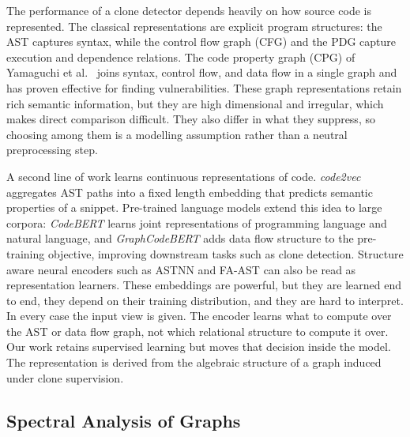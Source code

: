\documentclass[final,5p,times,twocolumn]{elsarticle}
\newcommand{\added}[1]{{\color{green!50!black}#1}}
\theoremstyle{plain}
\begin{document}
The performance of a clone detector depends heavily on how source code is
represented. The classical representations are explicit program structures:
the AST captures syntax, while the control flow graph (CFG) and the PDG
capture execution and dependence relations. The code property graph (CPG) of
Yamaguchi et al.\ \cite{yamaguchi2014cpg} joins syntax, control flow, and data
flow in a single graph and has proven effective for finding vulnerabilities.
These graph representations retain rich semantic information, but they are
high dimensional and irregular, which makes direct comparison difficult.
\added{They also differ in what they suppress, so choosing among them is a
modelling assumption rather than a neutral preprocessing step.}

A second line of work learns continuous representations of code.
\emph{code2vec} \cite{alon2019code2vec} aggregates AST paths into a fixed
length embedding that predicts semantic properties of a snippet.
Pre-trained language models extend this idea to large corpora:
\emph{CodeBERT} \cite{feng2020codebert} learns joint representations of
programming language and natural language, and \emph{GraphCodeBERT}
\cite{guo2021graphcodebert} adds data flow structure to the pre-training
objective, improving downstream tasks such as clone detection.
Structure aware neural encoders such as ASTNN \cite{zhang2019astnn} and
FA-AST \cite{wang2020faast} can also be read as representation learners.
These embeddings are powerful, but they are learned end to end, they depend on
their training distribution, and they are hard to interpret. \added{In every case the input
view is given. The encoder learns what to compute over the AST or data flow
graph, not which relational structure to compute it over. Our work retains
supervised learning but moves that decision inside the model. The representation
is derived from the algebraic structure of a graph induced under clone
supervision.}

\subsection{Spectral Analysis of Graphs}
\label{subsec:spectral}
\end{document}
